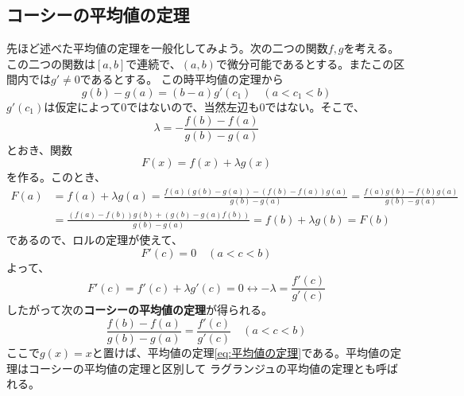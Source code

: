 \documentclass[a4j,dvipdfmx]{jsarticle}
\begin{document}
                \subsection{コーシーの平均値の定理}
                    先ほど述べた平均値の定理を一般化してみよう。次の二つの関数$f,g$を考える。
                    この二つの関数は$[a,b]$で連続で、$(a,b)$で微分可能であるとする。またこの区間内では$g'\neq 0$であるとする。
                    この時平均値の定理から
                    \begin{equation*}
                        g(b)-g(a)=(b-a)g'(c_1)\quad(a<c_1<b)
                    \end{equation*}
                    $g'(c_1)$は仮定によって$0$ではないので、当然左辺も$0$ではない。そこで、
                    \begin{equation*}
                        \lambda=-\frac{f(b)-f(a)}{g(b)-g(a)}
                    \end{equation*}
                    とおき、関数
                    \begin{equation*}
                        F(x)=f(x)+\lambda g(x)
                    \end{equation*}
                    を作る。このとき、
                    \begin{align*}
                        F(a)&=f(a)+\lambda g(a)=\frac{f(a)(g(b)-g(a))-(f(b)-f(a))g(a)}{g(b)-g(a)}=\frac{f(a)g(b)-f(b)g(a)}{g(b)-g(a)}\\
                        &=\frac{(f(a)-f(b))g(b)+(g(b)-g(a)f(b))}{g(b)-g(a)}=f(b)+\lambda g(b)=F(b)
                    \end{align*}
                    であるので、ロルの定理が使えて、
                    \begin{equation*}
                        F'(c)=0\quad(a<c<b)
                    \end{equation*}
                    よって、
                    \begin{equation*}
                        F'(c)=f'(c)+\lambda g'(c)=0\leftrightarrow -\lambda = \frac{f'(c)}{g'(c)}
                    \end{equation*}
                    したがって次の\textbf{コーシーの平均値の定理}が得られる。
                    \begin{equation}
                        \frac{f(b)-f(a)}{g(b)-g(a)}=\frac{f'(c)}{g'(c)}\quad(a<c<b)\label{eq:コーシーの平均値の定理}
                    \end{equation}
                    ここで$g(x)=x$と置けば、平均値の定理\eqref{eq:平均値の定理}である。平均値の定理はコーシーの平均値の定理と区別して
                    ラグランジュの平均値の定理とも呼ばれる。
    
\end{document}
